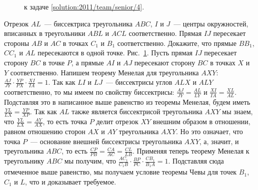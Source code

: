 \ifsolution
\begin{figure}\centering
    \caption{к задаче \ref{solution:2011/team/senior/4}.}
    \label{fig:solution:2011/team/senior/4}
\end{figure}
\fi %

\problem{}
Отрезок $AL$~--- биссектриса треугольника $ABC$, $I$ и $J$~--- центры
окружностей, вписанных в треугольники $ABL$ и $ACL$ соответственно.
Прямая $IJ$ пересекает стороны $AB$ и $AC$ в точках $C_1$ и $B_1$
соответственно.
Докажите, что прямые $B B_1$, $C C_1$ и $AL$ пересекаются в одной точке.
\solution
\label{solution:2011/team/senior/4}%
Рис.~\ref{fig:solution:2011/team/senior/4}.
Пусть прямая $IJ$ пересекает сторону $BC$ в точке $P$, а прямые $AI$ и $AJ$
пересекают сторону $BC$ в точках $X$ и $Y$ соответственно.
Напишем теорему Менелая для треугольника $AXY$:
\(
    \frac{AJ}{JY}
    \cdot
    \frac{YP}{PX}
    \cdot
    \frac{XI}{IA}
=
    1
\).
Так как $LI$ и $LJ$~--- биссектрисы углов $ALX$ и $ALY$ соответственно, то мы
имеем по свойству биссектрисы:
$\frac{AJ}{JY} = \frac{AL}{LY}$ и $\frac{XI}{IA} = \frac{XL}{AL}$.
Подставляя это в написанное выше равенство из теоремы Менелая, будем иметь
$\frac{YL}{LX} = \frac{YP}{XP}$.
Так как $AL$ также является биссектрисой треугольника $AXY$ мы знаем, что
$\frac{YL}{LX} = \frac{AY}{AX}$, то есть точка $P$ делит отрезок $XY$ внешним
образом в отношении, равном отношению сторон $AX$ и $AY$ треугольника $AXY$.
Но это означает, что точка $P$~--- основание внешней биссектрисы треугольника
$AXY$, а, значит, и треугольника $ABC$, то есть
$\frac{CP}{PB} = \frac{CA}{AC} = \frac{CL}{LB}$.
Применяя теперь теорему Менелая к треугольнику $ABC$ мы получим, что
\(
    \frac{A C_1}{C_1 B}
    \cdot
    \frac{BP}{PC}
    \cdot
    \frac{C B_1}{B_1 A}
=
    1
\).
Подставляя сюда отмеченное выше равенство, мы получаем условие теоремы Чевы для
точек $B_1$, $C_1$ и $L$, что и доказывает требуемое.
\endproblem
